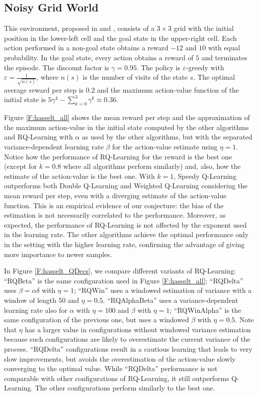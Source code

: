 \subsection{Noisy Grid World}
This environment, proposed in \cite{van2010double}  and \cite{deramo2016estimating}, consists of a $3 \times 3$ grid with the initial position in the lower-left cell and the goal state in the upper-right cell. Each action performed in a non-goal state obtains a reward $-12$ and $10$ with equal probability. In the goal state, every action obtains a reward of $5$ and terminates the episode. The discount factor is $\gamma = 0.95$. The policy is $\varepsilon$-greedy with $\varepsilon = \frac{1}{\sqrt{n(s)}}$, where $n(s)$ is the number of  visits of the state $s$. The optimal average reward per step is $0.2$ and the maximum action-value function of the initial state is $5\gamma^4 - \sum_{k=0}^3 \gamma^k \approx 0.36$.

Figure \ref{F:hasselt_all} shows the mean reward per step and the approximation of the maximum action-value in the initial state computed by the other algorithms and RQ-Learning with $\alpha$ as used by the other algorithms, but with the separated variance-dependent learning rate $\beta$ for the action-value estimate using $\eta = 1$. Notice how the performance of RQ-Learning for the reward is the best one (except for $k=0.8$ where all algorithms perform similarly) and, also, how the estimate of the action-value is the best one. With $k=1$, Speedy Q-Learning outperforms both Double Q-Learning and Weighted Q-Learning considering the mean reward per step, even with a diverging estimate of the action-value function. This is an empirical evidence of our conjecture: the bias of the estimation is not necessarily correlated to the performance. Moreover, as expected, the performance of RQ-Learning is not affected by the exponent used in the learning rate. The other algorithms achieve the optimal performance only in the setting with the higher learning rate, confirming the advantage of giving more importance to newer samples.

In Figure \ref{F:hasselt_QDecs}, we compare different variants of RQ-Learning: ``RQBeta'' is the same configuration used in Figure \ref{F:hasselt_all}; ``RQDelta'' uses $\beta = \alpha \delta$ with $\eta = 1$; ``RQWin'' uses a windowed estimation of variance with a window of length $50$ and $\eta = 0.5$. ``RQAlphaBeta'' uses a variance-dependent learning rate also for $\alpha$ with $\eta = 100$ and $\beta$ with $\eta = 1$; ``RQWinAlpha'' is the same configuration of the previous one, but uses a windowed $\beta$ with $\eta = 0.5$. Note that $\eta$ has a larger value in configurations without windowed variance estimation because such configurations are likely to overestimate the current variance of the process. ``RQDelta'' configurations result in a cautious learning that leads to very slow improvements, but avoids the overestimation of the action-value slowly converging to the optimal value. While ``RQDelta'' performance is not comparable with other configurations of RQ-Learning, it still outperforms Q-Learning. The other configurations perform similarly to the best one.

